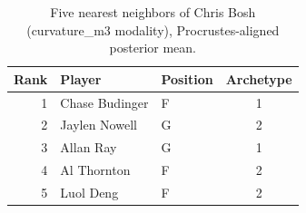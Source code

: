 \begin{table}[htbp]
  \centering\small
  \begin{tabular}{rllc}
    \toprule
    Rank & Player & Position & Archetype \\
    \midrule
    1 & Chase Budinger & F & 1 \\
    2 & Jaylen Nowell & G & 2 \\
    3 & Allan Ray & G & 1 \\
    4 & Al Thornton & F & 2 \\
    5 & Luol Deng & F & 2 \\
    \bottomrule
  \end{tabular}
  \caption{Five nearest neighbors of Chris Bosh (curvature_m3 modality), Procrustes-aligned posterior mean.}
  \label{tab:Chris_Bosh_neighbors_curvature_m3}
\end{table}


